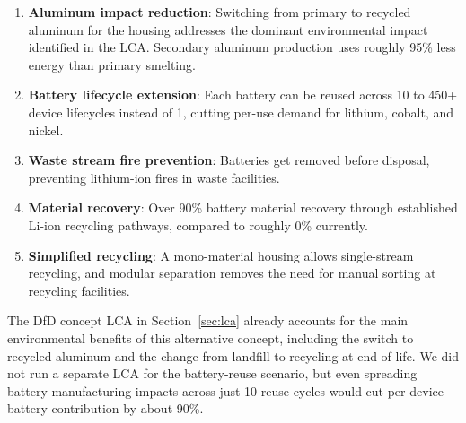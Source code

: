 \begin{enumerate}
    \item \textbf{Aluminum impact reduction}: Switching from primary to recycled aluminum for the housing addresses the dominant environmental impact identified in the LCA. Secondary aluminum production uses roughly 95\% less energy than primary smelting.
    \item \textbf{Battery lifecycle extension}: Each battery can be reused across 10 to 450+ device lifecycles instead of 1, cutting per-use demand for lithium, cobalt, and nickel.
    \item \textbf{Waste stream fire prevention}: Batteries get removed before disposal, preventing lithium-ion fires in waste facilities.
    \item \textbf{Material recovery}: Over 90\% battery material recovery through established Li-ion recycling pathways, compared to roughly 0\% currently.
    \item \textbf{Simplified recycling}: A mono-material housing allows single-stream recycling, and modular separation removes the need for manual sorting at recycling facilities.
\end{enumerate}

The DfD concept LCA in Section~\ref{sec:lca} already accounts for the main environmental benefits of this alternative concept, including the switch to recycled aluminum and the change from landfill to recycling at end of life. We did not run a separate LCA for the battery-reuse scenario, but even spreading battery manufacturing impacts across just 10 reuse cycles would cut per-device battery contribution by about 90\%.
